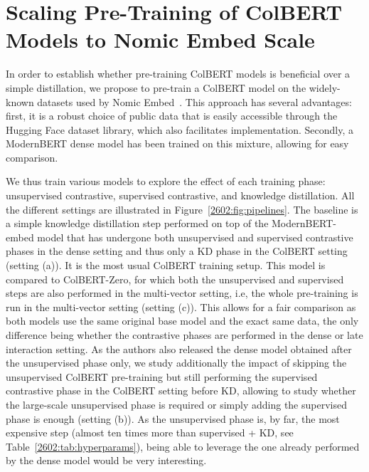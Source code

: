 \section{Scaling Pre-Training of ColBERT Models to Nomic Embed Scale}

In order to establish whether pre-training ColBERT models is beneficial over a simple distillation, we propose to pre-train a ColBERT model on the widely-known datasets used by Nomic Embed~\cite{nussbaum2025nomic}. 
This approach has several advantages: first, it is a robust choice of public data that is easily accessible through the Hugging Face dataset library, which also facilitates implementation. Secondly, a ModernBERT dense model has been trained on this mixture, allowing for easy comparison.

We thus train various models to explore the effect of each training phase: unsupervised contrastive, supervised contrastive, and knowledge distillation. All the different settings are illustrated in Figure~\ref{2602:fig:pipelines}.
The baseline is a simple knowledge distillation step performed on top of the ModernBERT-embed model that has undergone both unsupervised and supervised contrastive phases in the dense setting and thus only a KD phase in the ColBERT setting (setting (a)). It is the most usual ColBERT training setup.
This model is compared to ColBERT-Zero, for which both the unsupervised and supervised steps are also performed in the multi-vector setting, i.e, the whole pre-training is run in the multi-vector setting (setting (c)). This allows for a fair comparison as both models use the same original base model and the exact same data, the only difference being whether the contrastive phases are performed in the dense or late interaction setting.
As the authors also released the dense model obtained after the unsupervised phase only, we study additionally the impact of skipping the unsupervised ColBERT pre-training but still performing the supervised contrastive phase in the ColBERT setting before KD, allowing to study whether the large-scale unsupervised phase is required or simply adding the supervised phase is enough (setting (b)). As the unsupervised phase is, by far, the most expensive step (almost ten times more than supervised + KD, see Table~\ref{2602:tab:hyperparams}), being able to leverage the one already performed by the dense model would be very interesting. 


